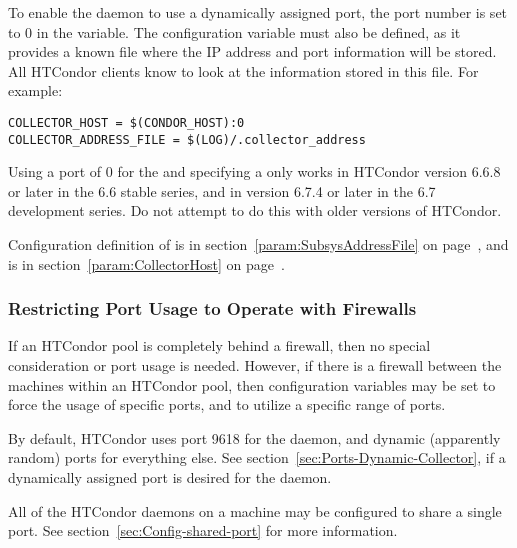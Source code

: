 To enable the  daemon to use a dynamically assigned port,
the port number is set to 0 in the 
variable.
The 
configuration variable must also be defined,
as it provides a known file where the IP address
and port information will be stored.
All HTCondor clients know to look at the
information stored in this file.
For example:
\footnotesize
\begin{verbatim}
COLLECTOR_HOST = $(CONDOR_HOST):0
COLLECTOR_ADDRESS_FILE = $(LOG)/.collector_address
\end{verbatim}
\normalsize

\Note Using a port of 0 for the 
and specifying a
only works in HTCondor version 6.6.8 or later in the 6.6 stable series,
and in version 6.7.4 or later in the 6.7 development series.
Do not attempt to do this with older versions of HTCondor.

Configuration definition of 
is in section~\ref{param:SubsysAddressFile} on
page~\pageref{param:SubsysAddressFile},
and
is in
section~\ref{param:CollectorHost} on
page~\pageref{param:CollectorHost}.


\subsubsection{\label{sec:Ports-Firewalls}Restricting Port Usage to
 Operate with Firewalls}

If an HTCondor pool is completely behind a firewall,
then no special consideration or port usage is needed.
However, if there is a firewall between the machines within
an HTCondor pool, then
configuration variables may be set to force the usage of
specific ports, and to utilize a specific range of ports.

By default,
HTCondor uses port 9618 for the  daemon,
and dynamic (apparently random) ports for everything else.
See section~\ref{sec:Ports-Dynamic-Collector},
if a dynamically assigned port is desired for the
 daemon.

All of the HTCondor daemons on a machine
may be configured to share a single
port.  See section~\ref{sec:Config-shared-port} for more information.

